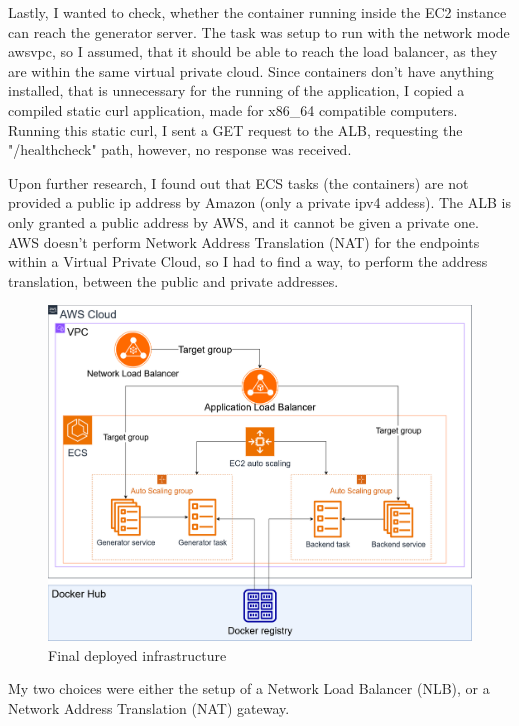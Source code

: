 		Lastly, I wanted to check, whether the container running inside the EC2 instance can reach the generator server. The task was 
		setup to run with the network mode awsvpc, so I assumed, that it should be able to reach the load balancer, as they are within the 
		same virtual private cloud. Since containers don't have anything installed, that is unnecessary for the running of the application,
		I copied a compiled static curl application, made for x86\_64 compatible computers. Running this static curl, I sent a GET request
		to the ALB, requesting the "/healthcheck" path, however, no response was received.

		Upon further research, I found out that ECS tasks (the containers) are not provided a public ip address by Amazon (only a private ipv4 addess). 
		The ALB is only granted a public address by AWS, and it cannot be given a private one. AWS doesn't perform Network Address Translation (NAT)
		for the endpoints within a Virtual Private Cloud, so I had to find a way, to perform the address translation, between the public and private 
		addresses.

		\begin{figure}[h!]
			\begin{center}
				\includegraphics[scale=0.35]{include/imgs/final_aws_infra.png}
				\caption{Final deployed infrastructure}
				\label{infrafinal}
			\end{center}
		\end{figure}
		My two choices were either the setup of a Network Load Balancer (NLB), or a Network Address Translation (NAT) gateway. 
		
